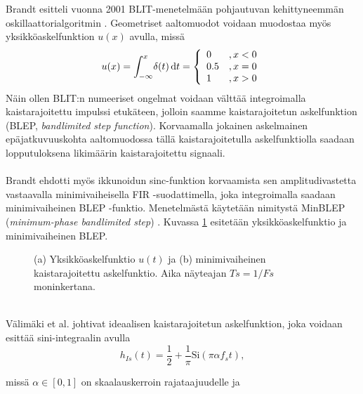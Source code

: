 \documentclass[finnish,12pt,a4paper,pdftex]{article} %
\begin{document}
Brandt esitteli vuonna 2001 BLIT-menetelmään pohjautuvan kehittyneemmän oskillaattorialgoritmin \cite{Brandt2001}. Geometriset aaltomuodot voidaan muodostaa myös yksikköaskelfunktion $u(x)$ avulla, missä
\begin{equation}
u(x) = \int_{-\infty}^x \! \delta(t) \, \mathrm{d}t =
\left\{
  \begin{array}{lr}
    0	& ,x < 0 \\
    0.5 & ,x = 0 \\
    1 &, x > 0 
  \end{array}
\right. \vspace{1mm}
\end{equation}
Näin ollen BLIT:n numeeriset ongelmat voidaan välttää integroimalla kaistarajoitettu impulssi etukäteen, jolloin saamme kaistarajoitetun askelfunktion (BLEP, \textit{bandlimited step function}). Korvaamalla jokainen askelmainen epäjatkuvuuskohta aaltomuodossa tällä kaistarajoitetulla askelfunktiolla saadaan lopputuloksena likimäärin kaistarajoitettu signaali. \cite{Valimaki2012} \\\\
Brandt ehdotti myös ikkunoidun sinc-funktion korvaamista sen amplitudivastetta vastaavalla minimivaiheisella FIR -suodattimella, joka integroimalla saadaan minimivaiheinen BLEP -funktio.
Menetelmästä käytetään nimitystä MinBLEP (\textit{minimum-phase bandlimited step}) \cite{Brandt2001}. Kuvassa \ref{fig:blep} esitetään yksikköaskelfunktio ja minimivaiheinen BLEP.
\vspace{2mm}
\begin{figure}[h] 
\begin{center} 	
\caption{(a) Yksikköaskelfunktio $u(t)$ ja (b) minimivaiheinen kaistarajoitettu askelfunktio. Aika näyteajan $Ts = 1/Fs$ moninkertana.}
\label{fig:blep}
\end{center}
\end{figure} \\
Välimäki et al.  johtivat ideaalisen kaistarajoitetun askelfunktion, joka voidaan esittää sini-integraalin avulla \cite{Valimaki2012}
\begin{equation}
h_{Is}(t) = \frac{1}{2}+\frac{1}{\pi}\text{Si}(\pi \alpha f_s t),
\end{equation}
\begin{center}
missä $\alpha \in [0,1]$ on skaalauskerroin rajataajuudelle ja
\end{center}
\end{document}
